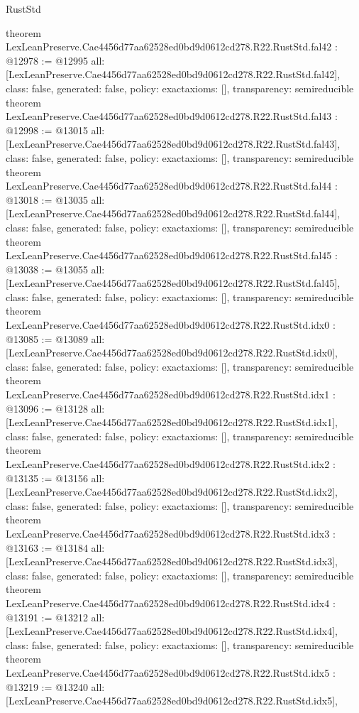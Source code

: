 \begin{lexlean}{RustStd}
\begin{coremodule}
{}
theorem LexLeanPreserve.Cae4456d77aa62528ed0bd9d0612cd278.R22.RustStd.fal42 : @12978 := @12995 {
  all: [LexLeanPreserve.Cae4456d77aa62528ed0bd9d0612cd278.R22.RustStd.fal42],
  class: false,
  generated: false,
  policy: exact{axioms: []},
  transparency: semireducible
}
theorem LexLeanPreserve.Cae4456d77aa62528ed0bd9d0612cd278.R22.RustStd.fal43 : @12998 := @13015 {
  all: [LexLeanPreserve.Cae4456d77aa62528ed0bd9d0612cd278.R22.RustStd.fal43],
  class: false,
  generated: false,
  policy: exact{axioms: []},
  transparency: semireducible
}
theorem LexLeanPreserve.Cae4456d77aa62528ed0bd9d0612cd278.R22.RustStd.fal44 : @13018 := @13035 {
  all: [LexLeanPreserve.Cae4456d77aa62528ed0bd9d0612cd278.R22.RustStd.fal44],
  class: false,
  generated: false,
  policy: exact{axioms: []},
  transparency: semireducible
}
theorem LexLeanPreserve.Cae4456d77aa62528ed0bd9d0612cd278.R22.RustStd.fal45 : @13038 := @13055 {
  all: [LexLeanPreserve.Cae4456d77aa62528ed0bd9d0612cd278.R22.RustStd.fal45],
  class: false,
  generated: false,
  policy: exact{axioms: []},
  transparency: semireducible
}
theorem LexLeanPreserve.Cae4456d77aa62528ed0bd9d0612cd278.R22.RustStd.idx0 : @13085 := @13089 {
  all: [LexLeanPreserve.Cae4456d77aa62528ed0bd9d0612cd278.R22.RustStd.idx0],
  class: false,
  generated: false,
  policy: exact{axioms: []},
  transparency: semireducible
}
theorem LexLeanPreserve.Cae4456d77aa62528ed0bd9d0612cd278.R22.RustStd.idx1 : @13096 := @13128 {
  all: [LexLeanPreserve.Cae4456d77aa62528ed0bd9d0612cd278.R22.RustStd.idx1],
  class: false,
  generated: false,
  policy: exact{axioms: []},
  transparency: semireducible
}
theorem LexLeanPreserve.Cae4456d77aa62528ed0bd9d0612cd278.R22.RustStd.idx2 : @13135 := @13156 {
  all: [LexLeanPreserve.Cae4456d77aa62528ed0bd9d0612cd278.R22.RustStd.idx2],
  class: false,
  generated: false,
  policy: exact{axioms: []},
  transparency: semireducible
}
theorem LexLeanPreserve.Cae4456d77aa62528ed0bd9d0612cd278.R22.RustStd.idx3 : @13163 := @13184 {
  all: [LexLeanPreserve.Cae4456d77aa62528ed0bd9d0612cd278.R22.RustStd.idx3],
  class: false,
  generated: false,
  policy: exact{axioms: []},
  transparency: semireducible
}
theorem LexLeanPreserve.Cae4456d77aa62528ed0bd9d0612cd278.R22.RustStd.idx4 : @13191 := @13212 {
  all: [LexLeanPreserve.Cae4456d77aa62528ed0bd9d0612cd278.R22.RustStd.idx4],
  class: false,
  generated: false,
  policy: exact{axioms: []},
  transparency: semireducible
}
theorem LexLeanPreserve.Cae4456d77aa62528ed0bd9d0612cd278.R22.RustStd.idx5 : @13219 := @13240 {
  all: [LexLeanPreserve.Cae4456d77aa62528ed0bd9d0612cd278.R22.RustStd.idx5],
}
\end{coremodule}
\end{lexlean}
